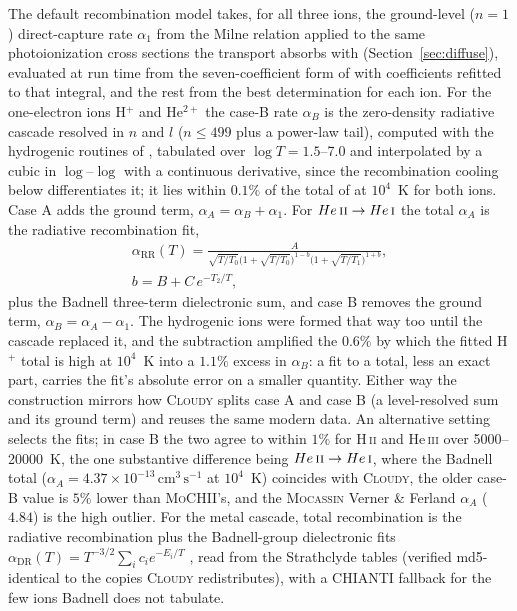 \documentclass[twocolumn,linenumbers]{aastex702}
\newcommand{\MoCHII}{\textsc{MoCHII}}
\newcommand{\HII}{H\,\textsc{ii}}
\newcommand{\HeI}{He\,\textsc{i}}
\newcommand{\HeII}{He\,\textsc{ii}}
\newcommand{\HeIII}{He\,\textsc{iii}}
\newcommand{\cmc}{\mathrm{cm^{3}\,s^{-1}}}
\begin{document}
The default recombination model takes, for all three ions, the ground-level
($n=1$) direct-capture rate $\alpha_1$ from the Milne relation applied to
the same photoionization cross sections the transport absorbs with
(Section~\ref{sec:diffuse}), evaluated at run time from the
seven-coefficient form of \citet{mao2016} with coefficients refitted to
that integral, and the rest from the best determination for each ion.  For
the one-electron ions H$^{+}$ and He$^{2+}$ the case-B rate $\alpha_B$ is
the zero-density radiative cascade resolved in $n$ and $l$ ($n \le 499$
plus a power-law tail), computed with the hydrogenic routines of
\citet{storey1991}, tabulated over $\log T = 1.5$--7.0 and interpolated by
a cubic in $\log$--$\log$ with a continuous derivative, since the
recombination cooling below differentiates it; it lies within $0.1\%$ of
the total of \citet{storey1995} at $10^4$~K for both ions.  Case A adds the
ground term, $\alpha_A = \alpha_B + \alpha_1$.  For $\HeII\to\HeI$ the
total $\alpha_A$ is the \citet{badnell2006} radiative recombination fit,
\begin{gather}
  \alpha_{\mathrm{RR}}(T) =
  \frac{A}{\sqrt{T/T_0}\big(1+\sqrt{T/T_0}\big)^{1-b}
           \big(1+\sqrt{T/T_1}\big)^{1+b}},
  \nonumber\\
  b = B + C\,e^{-T_2/T},
  \label{eq:badnellrr}
\end{gather}%
plus the Badnell three-term dielectronic sum, and case B removes the ground
term, $\alpha_B = \alpha_A - \alpha_1$.  The hydrogenic ions were formed
that way too until the cascade replaced it, and the subtraction amplified
the $0.6\%$ by which the fitted H$^{+}$ total is high at $10^4$~K into a
$1.1\%$ excess in $\alpha_B$: a fit to a total, less an exact part,
carries the fit's absolute error on a smaller quantity.  Either way the
construction mirrors how \textsc{Cloudy} splits case A and case B (a
level-resolved sum and its ground term) and reuses the same modern data.
An alternative setting selects the \citet{huignedin1997} fits; in case B
the two agree to within $1\%$ for \HII{} and \HeIII{} over 5000--20000~K,
the one substantive difference being $\HeII\to\HeI$, where the Badnell
total ($\alpha_A = 4.37\times10^{-13}\,\cmc$ at $10^4$~K) coincides with
\textsc{Cloudy}, the older \citet{huignedin1997} case-B value is $5\%$
lower than \MoCHII's, and the \textsc{Mocassin} Verner \& Ferland
$\alpha_A$ ($4.84$) is the high outlier.
For the metal cascade, total recombination is the \citet{badnell2006}
radiative recombination plus the Badnell-group dielectronic fits
$\alpha_{\mathrm{DR}}(T) = T^{-3/2}\sum_i c_i e^{-E_i/T}$
\citep{badnell2003}, read from the Strathclyde tables (verified md5-identical
to the copies \textsc{Cloudy} redistributes), with a CHIANTI fallback for
the few ions Badnell does not tabulate.
\end{document}
